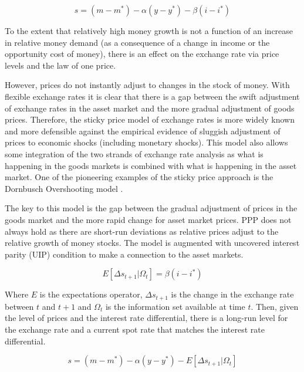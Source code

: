 \documentclass[12pt, a4paper, oneside]{article}\usepackage[]{graphicx}\usepackage[]{color}
\begin{document}
\begin{equation}
s=(m-m^*)-\alpha (y-y^*) - \beta(i-i^*)
\end{equation}

To the extent that relatively high money growth is not a function of an increase in relative money demand (as a consequence of a change in income or the opportunity cost of money), there is an effect on the exchange rate via price levels and the law of one price.  

However, prices do not instantly adjust to changes in the stock of money.  With flexible exchange rates it is clear that there is a gap between the swift adjustment of exchange rates in the asset market and the more gradual adjustment of goods prices.  Therefore, the sticky price model of exchange rates is more widely known and more defensible against the empirical evidence of sluggish adjustment of prices to economic shocks (including monetary shocks).  This model also allows some integration of the two strands of exchange rate analysis as what is happening in the goods markets is combined with what is happening in the asset market.  One of the pioneering examples of the sticky price approach is the Dornbusch Overshooting model \citep{Dornbusch1976Expectations}. 

The key to this model is the gap between the gradual adjustment of prices in the goods market and the more rapid change for asset market prices.  PPP does not always hold as there are short-run deviations as relative prices adjust to the relative growth of money stocks.  The model is augmented with uncovered interest parity (UIP) condition to make a connection to the asset markets.  

\begin{equation}\label{UIP}
E[\Delta s_{t+1}|\Omega_t]=\beta(i-i^*)
\end{equation}

Where $E$ is the expectations operator, $\Delta s_{t+1}$ is the change in the exchange rate between $t$ and $t + 1$ and $\Omega_t$ is the information set available at time $t$.  Then, given the level of prices and the interest rate differential, there is a long-run level for the exchange rate and a current spot rate that matches the interest rate differential. 

\begin{equation} 
s=(m-m^*)-\alpha(y-y^*)-E[\Delta s_{t+1}|\Omega_t]
\end{equation}
\end{document}
